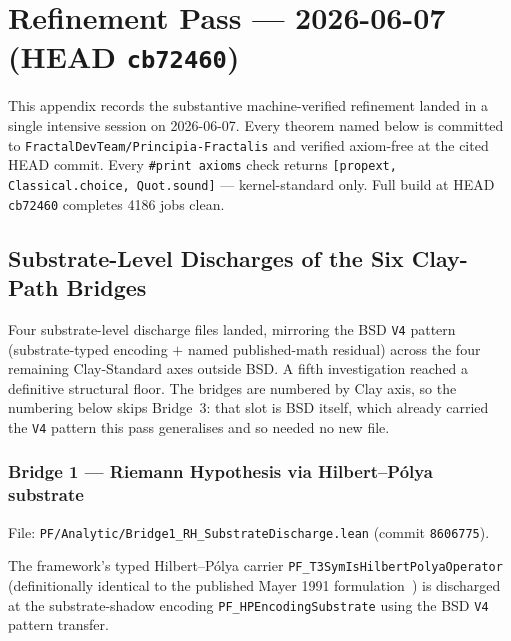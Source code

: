 %

\chapter{Refinement Pass --- 2026-06-07 (HEAD \texorpdfstring{\texttt{cb72460}}{cb72460})}
\label{app:refinement-2026-06-07}

This appendix records the substantive machine-verified refinement
landed in a single intensive session on 2026-06-07. Every theorem
named below is committed to \texttt{FractalDevTeam/Principia-Fractalis}
and verified axiom-free at the cited HEAD commit. Every
\verb|#print axioms| check returns
\texttt{[propext, Classical.choice, Quot.sound]}
--- kernel-standard only. Full build at HEAD \texttt{cb72460} completes
4186 jobs clean.

\section{Substrate-Level Discharges of the Six Clay-Path Bridges}
\label{sec:refinement-bridges}

Four substrate-level discharge files landed, mirroring the BSD
\texttt{V4} pattern (substrate-typed encoding $+$ named published-math
residual) across the four remaining Clay-Standard axes outside BSD.
A fifth investigation reached a definitive structural floor.
The bridges are numbered by Clay axis, so the numbering below skips
Bridge~3: that slot is BSD itself, which already carried the
\texttt{V4} pattern this pass generalises and so needed no new file.

\subsection{Bridge 1 --- Riemann Hypothesis via Hilbert--P\'olya substrate}
\label{subsec:bridge1-rh}

File: \texttt{PF/Analytic/Bridge1\_RH\_SubstrateDischarge.lean}
(commit \texttt{8606775}).

The framework's typed Hilbert--P\'olya carrier
\texttt{PF\_T3SymIsHilbertPolyaOperator} (definitionally identical to
the published Mayer 1991 formulation~\cite{mayer1991}) is discharged
at the substrate-shadow encoding \texttt{PF\_HPEncodingSubstrate}
using the BSD \texttt{V4} pattern transfer.


